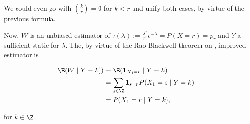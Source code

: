 \begin{solution}
\begin{enumerate}[label = (\alph*)]
\begin{enumerate}[label = \arabic*.]
    \end{enumerate}

    We could even go with $\binom{k}{r} = 0$ for $k < r$ and unify both cases, by virtue of the previous formula.

    Now, $W$ is an unbiased estimator of $\tau(\lambda) := \frac{\lambda^r}{r!} e^{-\lambda} = P(X = r) = p_r$ and $Y$ a sufficient static for $\lambda$.
    The, by virtue of the Rao-Blackwell theorem on \cite[lecture 8, slide 37]{EStat}, improved estimator is

    \begin{align*}
        \E(W \mid Y = k))
        & =
        \E(\mathbf 1_{X_1 = r} \mid Y = k) \\
        & =
        \sum_{s \in \Z}
            \mathbf 1_{s = r}
            P(X_1 = s \mid Y = k) \\
        & =
        P(X_1 = r \mid Y = k),
    \end{align*}

    for $k \in \Z$.

\end{enumerate}

\end{solution}

